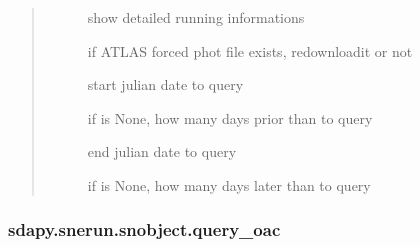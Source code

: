 \documentclass[letterpaper,10pt,english]{sphinxmanual}
\begin{document}
\begin{fulllineitems}
\begin{fulllineitems}
\begin{quote}
\begin{description}
\begin{description}
\item[{}] \leavevmode{[}\sphinxtitleref{bool}{]}
show detailed running informations

\item[{}] \leavevmode{[}\sphinxtitleref{bool}{]}
if ATLAS forced phot file exists, re\sphinxhyphen{}downloadit or not

\item[{}] \leavevmode{[}\sphinxtitleref{float}{]}
start julian date to query

\item[{}] \leavevmode{[}\sphinxtitleref{float}{]}
if  is None, how many days prior than  to query

\item[{}] \leavevmode{[}\sphinxtitleref{float}{]}
end julian date to query

\item[{}] \leavevmode{[}\sphinxtitleref{float}{]}
if  is None, how many days later than  to query

\end{description}

\end{description}\end{quote}

\end{fulllineitems}



\subsubsection{sdapy.snerun.snobject.query\_oac}
\label{\detokenize{generated/sdapy.snerun.snobject.query_oac:sdapy-snerun-snobject-query-oac}}\label{\detokenize{generated/sdapy.snerun.snobject.query_oac::doc}}


\end{fulllineitems}
\end{document}
